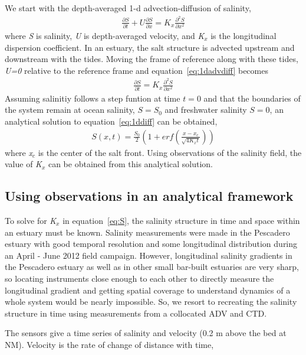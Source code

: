 We start with the depth-averaged 1-d advection-diffusion of salinity,
\begin{eqnarray}
\frac{\partial S}{\partial t} + U\frac{\partial S}{\partial x} = K_x\frac{\partial^2S}{\partial x^2} \label{eq:1dadvdiff}
\end{eqnarray}
where \emph{S} is salinity, \emph{U} is depth-averaged velocity, and \emph{K$_x$} is the longitudinal dispersion coefficient. In an estuary, the salt structure is advected upstream and downstream with the tides. Moving the frame of reference along with these tides, \emph{U=0} relative to the reference frame and equation~\ref{eq:1dadvdiff} becomes
\begin{eqnarray}
\frac{\partial S}{\partial t} = K_x\frac{\partial^2S}{\partial x^2} \label{eq:1ddiff}
\end{eqnarray}
Assuming salinitiy follows a step funtion at time $t=0$ and that the boundaries of the system remain at ocean salinity, $S=S_0$ and freshwater salinity $S=0$, an analytical solution to equation~\ref{eq:1ddiff} can be obtained,
\begin{eqnarray}
S(x,t) = \frac{S_0}{2}\left(1+erf\left(\frac{x-x_c}{\sqrt{4K_xt}}\right)\right) \label{eq:S}
\end{eqnarray}
where \emph{x$_c$} is the center of the salt front. Using observations of the salinity field, the value of \emph{K$_x$} can be obtained from this analytical solution.


\subsection{Using observations in an analytical framework} \label{ssec:ObsInto1DAdvDiff}
To solve for \emph{K$_x$} in equation~\ref{eq:S}, the salinity structure in time and space within an estuary must be known. Salinity measurements were made in the Pescadero estuary with good temporal resolution and some longitudinal distribution during an April - June 2012 field campaign. However, longitudinal salinity gradients in the Pescadero estuary as well as in other small bar-built estuaries are very sharp, so locating instruments close enough to each other to directly measure the longitudinal gradient and getting spatial coverage to understand dynamics of a whole system would be nearly impossible. So, we resort to recreating the salinity structure in time using measurements from a collocated ADV and CTD. 

The sensors give a time series of salinity and velocity (0.2 m above the bed at NM). Velocity is the rate of change of distance with time,

